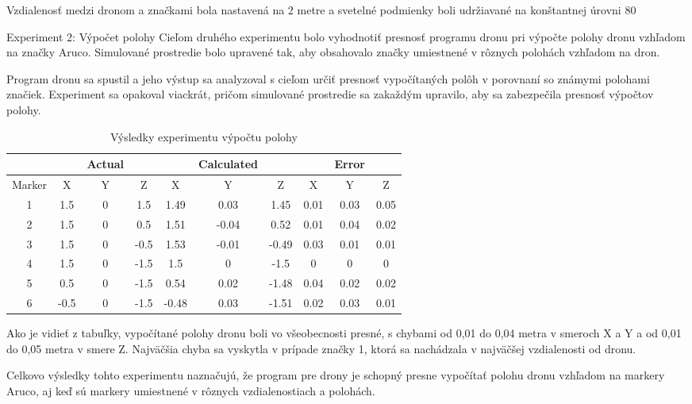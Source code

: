 Vzdialenosť medzi dronom a značkami bola nastavená na 2 metre a svetelné podmienky boli udržiavané na konštantnej úrovni 80 %

Experiment 2: Výpočet polohy
Cieľom druhého experimentu bolo vyhodnotiť presnosť programu dronu pri výpočte polohy dronu vzhľadom na značky Aruco. Simulované prostredie bolo upravené tak, aby obsahovalo značky umiestnené v rôznych polohách vzhľadom na dron.

Program dronu sa spustil a jeho výstup sa analyzoval s cieľom určiť presnosť vypočítaných polôh v porovnaní so známymi polohami značiek. Experiment sa opakoval viackrát, pričom simulované prostredie sa zakaždým upravilo, aby sa zabezpečila presnosť výpočtov polohy.

\begin{table}[h!] 
    \centering
        \begin{tabular}{|c | c c c | c c c | c c c|} 
        \hline
        & & Actual & & & Calculated & & &  Error & \\ [0.5ex] 
        \hline
        Marker &X&Y&Z& X & Y & Z & X & Y & Z \\
        \hline\hline
        1 & 1.5 & 0 & 1.5 & 1.49 & 0.03 & 1.45 & 0.01 & 0.03 & 0.05\\ 
        \hline
        2 & 1.5 & 0 & 0.5 & 1.51 & -0.04 & 0.52 & 0.01 & 0.04 & 0.02\\ 
        \hline
        3 & 1.5 & 0 & -0.5 & 1.53 & -0.01 & -0.49 & 0.03 & 0.01 & 0.01\\ 
        \hline
        4 & 1.5 & 0 & -1.5 & 1.5 & 0 & -1.5 & 0 & 0 & 0\\ 
        \hline
        5 & 0.5 & 0 & -1.5 & 0.54 & 0.02 & -1.48 & 0.04 & 0.02 & 0.02\\ 
        \hline
        6 & -0.5 & 0 & -1.5 & -0.48 & 0.03 & -1.51 & 0.02 & 0.03 & 0.01\\
        \hline 
       \end{tabular}
       \caption{Výsledky experimentu výpočtu polohy}
        \label{table:1}
\end{table}

Ako je vidieť z tabuľky, vypočítané polohy dronu boli vo všeobecnosti presné, s chybami od 0,01 do 0,04 metra v smeroch X a Y a od 0,01 do 0,05 metra v smere Z. Najväčšia chyba sa vyskytla v prípade značky 1, ktorá sa nachádzala v najväčšej vzdialenosti od dronu.

Celkovo výsledky tohto experimentu naznačujú, že program pre drony je schopný presne vypočítať polohu dronu vzhľadom na markery Aruco, aj keď sú markery umiestnené v rôznych vzdialenostiach a polohách.

